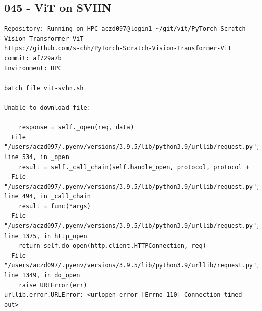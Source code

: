 \subsection{045 - ViT on SVHN}
\label{app_res:045}
\begin{verbatim}
Repository: Running on HPC aczd097@login1 ~/git/vit/PyTorch-Scratch-Vision-Transformer-ViT
https://github.com/s-chh/PyTorch-Scratch-Vision-Transformer-ViT
commit: af729a7b
Environment: HPC

batch file vit-svhn.sh

Unable to download file:

    response = self._open(req, data)
  File "/users/aczd097/.pyenv/versions/3.9.5/lib/python3.9/urllib/request.py", line 534, in _open
    result = self._call_chain(self.handle_open, protocol, protocol +
  File "/users/aczd097/.pyenv/versions/3.9.5/lib/python3.9/urllib/request.py", line 494, in _call_chain
    result = func(*args)
  File "/users/aczd097/.pyenv/versions/3.9.5/lib/python3.9/urllib/request.py", line 1375, in http_open
    return self.do_open(http.client.HTTPConnection, req)
  File "/users/aczd097/.pyenv/versions/3.9.5/lib/python3.9/urllib/request.py", line 1349, in do_open
    raise URLError(err)
urllib.error.URLError: <urlopen error [Errno 110] Connection timed out>

\end{verbatim}

